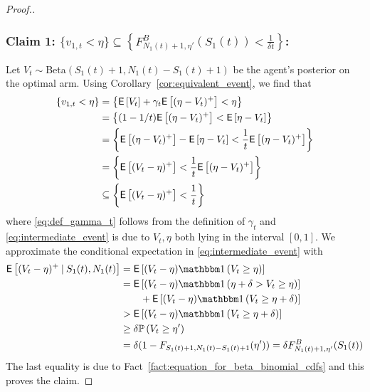 \begin{proof}[Proof.]
	\subsubsection*{Claim 1: $\{v_{1,t} < \eta\} \subseteq \left\{F^B_{N_1(t)+1, \eta'}(S_1(t)) < \frac{1}{\delta t}\right\}$:}
	Let $V_t \sim $Beta$(S_1(t)+1,N_1(t) - S_1(t) + 1)$ be the agent's posterior on the optimal arm. Using Corollary~\ref{cor:equivalent_event}, we find that
	\begin{align}
	\left\{v_{1,t} < \eta \right\} & = \left\{ \mathsf{E} \left[ V_t  \right] + \gamma_t\mathsf{E} \left[ (\eta - V_t)^+ \right] < \eta \right\} \nonumber\\
	& =  \left\{ (1-1/t)\mathsf{E} \left[ (\eta - V_t)^+ \right] < \mathsf{E} \left[ \eta - V_t \right] \right\} \label{eq:def_gamma_t} \\
	& =  \left\{ \mathsf{E} \left[ (\eta - V_t)^+ \right] - \mathsf{E} \left[ \eta - V_t \right] <  \frac{1}{t}\mathsf{E} \left[ (\eta - V_t)^+ \right]\right\} \nonumber\\
	& =  \left\{ \mathsf{E} \left[ (V_t - \eta)^+ \right]<  \frac{1}{t}\mathsf{E} \left[ (\eta - V_t)^+ \right]\right\} \nonumber\\
	& \subseteq \left\{ \mathsf{E} \left[  (V_t - \eta)^+ \right]< \frac{1}{t}  \right\}  \label{eq:intermediate_event}
	\end{align}
	where \eqref{eq:def_gamma_t} follows from the definition of $\gamma_t$ and \eqref{eq:intermediate_event} is due to $V_t, \eta$ both lying in the interval $[0,1]$. We approximate the conditional expectation in \eqref{eq:intermediate_event} with
	\begin{align}
	\Ee{(V_t - \eta)^+ \given S_1(t), N_1(t)} & = \Ee{(V_t - \eta) \ind{V_t \ge \eta} }\nonumber \\
	& = \Ee{(V_t - \eta) \ind{\eta + \delta > V_t \ge \eta} }  \nonumber \\
	& \qquad + \Ee{(V_t - \eta) \ind{ V_t \ge \eta + \delta} } \nonumber \\
	& > \Ee{(V_t - \eta) \ind{ V_t \ge \eta + \delta} } \nonumber \\
	& \ge \delta\P{ V_t \ge \eta' } \nonumber \\
	& = \delta (1 - F_{S_1(t)+1,N_1(t)-S_1(t)+1}(\eta')) = \delta F^B_{N_1(t)+1,\eta'}(S_1(t)) \label{ineq:lower_bound_on_ppart_term}
	\end{align}
	The last equality is due to Fact~\ref{fact:equation_for_beta_binomial_cdfs} and this proves the claim.

\end{proof}
